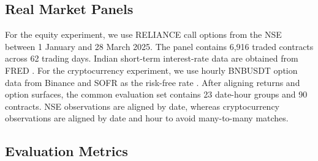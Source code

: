 \documentclass[sigconf,anonymous,review]{acmart}
\begin{document}
\subsection{Real Market Panels}

For the equity experiment, we use RELIANCE call options from the NSE \cite{nse_contract_data} between 1 January and 28 March 2025. The panel contains 6,916 traded contracts across 62 trading days. Indian short-term interest-rate data are obtained from FRED \cite{oecd_india_interest_rate}. For the cryptocurrency experiment, we use hourly BNBUSDT option data from Binance \cite{binance_bnbusdt_options} and SOFR as the risk-free rate \cite{nyfed_sofr}. After aligning returns and option surfaces, the common evaluation set contains 23 date-hour groups and 90 contracts. NSE observations are aligned by date, whereas cryptocurrency observations are aligned by date and hour to avoid many-to-many matches.



\subsection{Evaluation Metrics}
\label{sec:evaluation_metrics}
\end{document}
